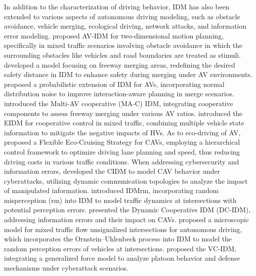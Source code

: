 \documentclass[a4paper,fleqn]{cas-sc}
\begin{document}
In addition to the characterization of driving behavior, IDM has also been extended to various aspects of autonomous driving modeling, such as obstacle avoidance, vehicle merging, ecological driving, network attacks, and information error modeling. \cite{sharath_enhanced_2020} proposed AV-IDM for two-dimensional motion planning, specifically in mixed traffic scenarios involving obstacle avoidance in which the surrounding obstacles like vehicles and road boundaries are treated as stimuli. \cite{chen_safety_2024} developed a model focusing on freeway merging areas, redefining the desired safety distance in IDM to enhance safety during merging under AV environments. \cite{ward_probabilistic_2017} proposed a probabilistic extension of IDM for AVs, incorporating normal distribution noise to improve interaction-aware planning in merge scenarios. \cite{zhou_impact_2017} introduced the Multi-AV cooperative (MA-C) IDM, integrating cooperative components to assess freeway merging under various AV ratios. \cite{zhou_cooperative_2023} introduced the EIDM for cooperative control in mixed traffic, combining multiple vehicle state information to mitigate the negative impacts of HVs. As to eco-driving of AV, \cite{dongFlexibleEcoCruisingStrategyConnected2024a} proposed a Flexible Eco-Cruising Strategy  for CAVs, employing a hierarchical control framework to optimize driving lane planning and speed, thus reducing driving costs in various traffic conditions. When addressing cybersecurity and information errors,\cite{wang_modeling_2020} developed the CIDM to model CAV behavior under cyberattacks, utilizing dynamic communication topologies to analyze the impact of manipulated information.  \cite{berkhahn_traffic_2022} introduced IDMrm, incorporating random misperception (rm) into IDM to model traffic dynamics at intersections with potential perception errors. \cite{li_unraveling_2024}presented the Dynamic Cooperative IDM (DC-IDM), addressing information errors and their impact on CAVs. \cite{liu_connected_2022} proposed a microscopic model for mixed traffic flow unsignalized intersections for autonomous driving, which incorporates the Ornstein–Uhlenbeck process into IDM to model the random perception errors of vehicles at intersections. \cite{luo_modeling_2024} proposed the VC-IDM, integrating a generalized force model to analyze platoon behavior and defense mechanisms under cyberattack scenarios.
\end{document}
